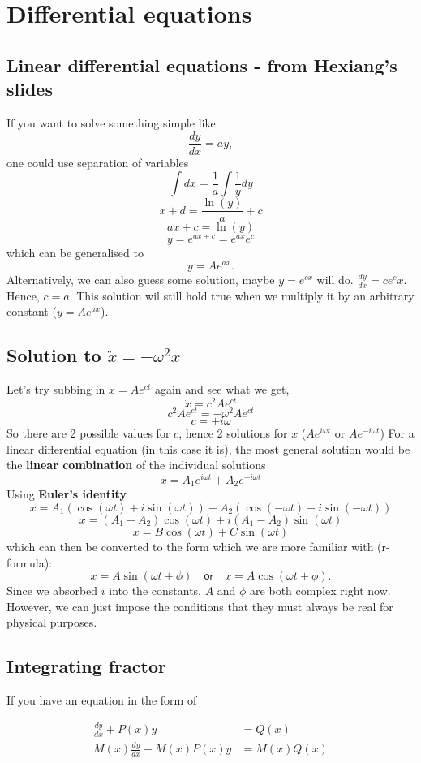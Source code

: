 \section{Differential equations}
\subsection{Linear differential equations - from Hexiang's slides}
If you want to solve something simple like
$$\frac{dy}{dx}=ay,$$
one could use separation of variables
$$\int dx=\frac{1}{a}\int \frac{1}{y} dy$$
$$x+d=\frac{\ln(y)}{a}+c$$
$$ax+c=\ln(y)$$
$$y=e^{ax+c}=e^{ax}e^c$$
which can be generalised to
$$y=Ae^{ax}.$$
Alternatively, we can also guess some solution, maybe $y=e^{cx}$ will do. $\frac{dy}{dx}=ce^cx$. Hence, $c=a$. This solution wil still hold true when we multiply it by an arbitrary constant ($y=Ae^{ax}$).

\subsection{Solution to $\ddot x=-\omega^2 x$}
Let's try subbing in $x=Ae^{ct}$ again and see what we get,
$$\ddot x= c^2 A e^{ct}$$
$$c^2 A e^{ct}=-\omega^2 Ae^{ct}$$
$$c=\pm i\omega$$
So there are 2 possible values for $c$, hence 2 solutions for $x$ ($Ae^{i\omega t}$ or $Ae^{-i\omega t}$)
For a linear differential equation (in this case it is), the most general solution would be the \textbf{linear combination} of the individual solutions
$$\boxed{x=A_1 e^{i\omega t} + A_2 e^{-i\omega t}}$$
Using \textbf{Euler's identity}
$$x=A_1(\cos(\omega t)+i \sin(\omega t))+A_2(\cos(-\omega t)+i \sin(-\omega t))$$
$$x=(A_1+A_2)\cos(\omega t)+i(A_1-A_2) \sin(\omega t)$$
$$x=B\cos(\omega t)+C\sin(\omega t)$$
which can then be converted to the form which we are more familiar with (r-formula): $$\boxed {x=A\sin(\omega t + \phi) \quad \textsf{or}\quad x=A\cos(\omega t + \phi).}$$ Since we absorbed $i$ into the constants, $A$ and $\phi$ are both complex right now. However, we can just impose the conditions that they must always be real for physical purposes.
\subsection{Integrating fractor}
If you have an equation in the form of

\begin{align}
    \frac{dy}{dx}+P(x)y &= Q(x)\\
    M(x)\frac{dy}{dx}+M(x)P(x)y &= M(x)Q(x)\\
\end{align}


